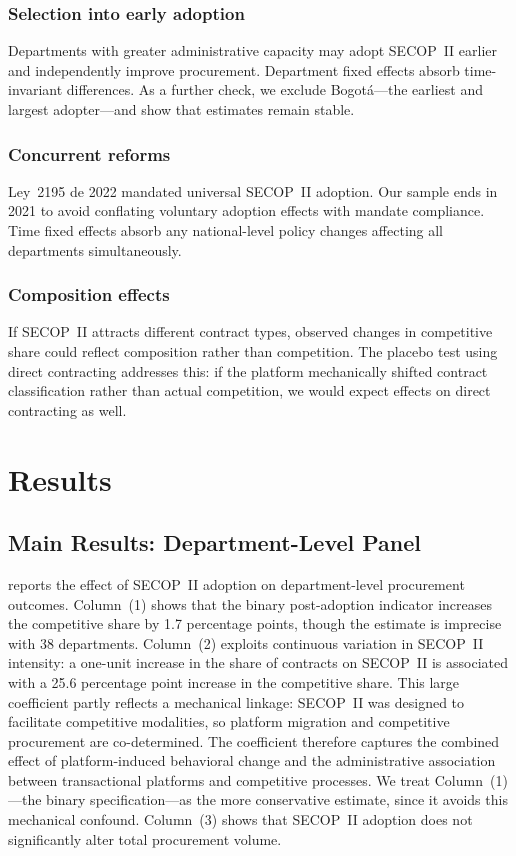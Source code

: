 \documentclass[12pt]{article}
\begin{document}
\subsubsection*{Selection into early adoption} Departments with greater administrative capacity may adopt SECOP~II earlier and independently improve procurement. Department fixed effects absorb time-invariant differences. As a further check, we exclude Bogot\'{a}---the earliest and largest adopter---and show that estimates remain stable.

\subsubsection*{Concurrent reforms} Ley~2195 de 2022 mandated universal SECOP~II adoption. Our sample ends in 2021 to avoid conflating voluntary adoption effects with mandate compliance. Time fixed effects absorb any national-level policy changes affecting all departments simultaneously.

\subsubsection*{Composition effects} If SECOP~II attracts different contract types, observed changes in competitive share could reflect composition rather than competition. The placebo test using direct contracting addresses this: if the platform mechanically shifted contract classification rather than actual competition, we would expect effects on direct contracting as well.


\section{Results}
\label{sec:results}

\subsection{Main Results: Department-Level Panel}

 reports the effect of SECOP~II adoption on department-level procurement outcomes. Column~(1) shows that the binary post-adoption indicator increases the competitive share by 1.7 percentage points, though the estimate is imprecise with 38 departments. Column~(2) exploits continuous variation in SECOP~II intensity: a one-unit increase in the share of contracts on SECOP~II is associated with a 25.6 percentage point increase in the competitive share. This large coefficient partly reflects a mechanical linkage: SECOP~II was designed to facilitate competitive modalities, so platform migration and competitive procurement are co-determined. The coefficient therefore captures the combined effect of platform-induced behavioral change and the administrative association between transactional platforms and competitive processes. We treat Column~(1)---the binary specification---as the more conservative estimate, since it avoids this mechanical confound. Column~(3) shows that SECOP~II adoption does not significantly alter total procurement volume.
\end{document}
